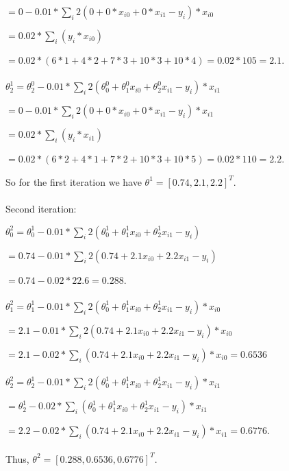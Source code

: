 \documentclass[12pt]{article}
\begin{document}
\begin{enumerate}
  $= 0 - 0.01 * \sum\limits_{i} 2 (0 + 0 * x_{i0} + 0 * x_{i1} - y_i) * x_{i0}$
  
  $= 0.02 * \sum\limits_{i} (y_i * x_{i0})$

  $= 0.02 * (6 * 1 + 4 * 2 + 7 * 3 + 10 * 3 + 10 * 4) = 0.02 * 105 = 2.1$. \\ \\

  $\theta^1_2 = \theta^0_2 - 0.01 * \sum\limits_{i} 2 (\theta^0_0 + \theta^0_1 x_{i0} + \theta^0_2 x_{i1} - y_i) * x_{i1}$

  $ = 0 - 0.01 * \sum\limits_{i} 2 (0 + 0 * x_{i0} + 0 * x_{i1} - y_i) * x_{i1}$
  
  $ = 0.02 * \sum\limits_{i} (y_i * x_{i1})$

  $ = 0.02 * (6 * 2 + 4 * 1 + 7 * 2 + 10 * 3 + 10 * 5) = 0.02 * 110 = 2.2$.

  So for the first iteration we have $\theta^1 = [0.74, 2.1, 2.2]^T$. \\ \\

  Second iteration:

  $\theta^2_0 = \theta^1_0 - 0.01 * \sum\limits_{i} 2 (\theta^1_0 + \theta^1_1 x_{i0} + \theta^1_2 x_{i1} - y_i)$

  $= 0.74 - 0.01 * \sum\limits_{i} 2 (0.74 + 2.1 x_{i0} + 2.2 x_{i1} - y_i)$
  
  $= 0.74 - 0.02 * 22.6 = 0.288$. \\ \\

  $\theta^2_1 = \theta^1_1 - 0.01 * \sum\limits_{i} 2 (\theta^1_0 + \theta^1_1 x_{i0} + \theta^1_2 x_{i1} - y_i) * x_{i0}$
  
  $= 2.1 - 0.01 * \sum\limits_{i} 2 (0.74 + 2.1 x_{i0} + 2.2 x_{i1} - y_i) * x_{i0}$
  
  $= 2.1 - 0.02 * \sum\limits_{i} (0.74 + 2.1 x_{i0} + 2.2 x_{i1} - y_i) * x_{i0} = 0.6536$ \\ \\

  $\theta^2_2 = \theta^1_2 - 0.01 * \sum\limits_{i} 2 (\theta^1_0 + \theta^1_1 x_{i0} + \theta^1_2 x_{i1} - y_i) * x_{i1}$

  $ = \theta^1_2 - 0.02 * \sum\limits_{i} (\theta^1_0 + \theta^1_1 x_{i0} + \theta^1_2 x_{i1} - y_i) * x_{i1}$
  
  $ = 2.2 - 0.02 * \sum\limits_{i} (0.74 + 2.1 x_{i0} + 2.2 x_{i1} - y_i) * x_{i1} = 0.6776$. \\ \\

  Thus, $\theta^2 = [0.288, 0.6536, 0.6776]^T$.

\end{enumerate}
\end{document}
